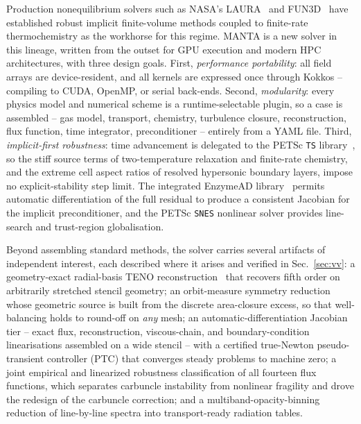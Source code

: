 \documentclass[journal,biblatex]{new-aiaa}
\begin{document}
Production nonequilibrium solvers such as NASA's LAURA~\cite{thompson_laura_2024} and FUN3D~\cite{anderson_fun3d_2025} have established robust implicit finite-volume methods coupled to finite-rate thermochemistry as the workhorse for this regime. MANTA is a new solver in this lineage, written from the outset for GPU execution and modern HPC architectures, with three design goals. First, \emph{performance portability}: all field arrays are device-resident, and all kernels are expressed once through Kokkos -- compiling to CUDA, OpenMP, or serial back-ends. Second, \emph{modularity}: every physics model and numerical scheme is a runtime-selectable plugin, so a case is assembled -- gas model, transport, chemistry, turbulence closure, reconstruction, flux function, time integrator, preconditioner -- entirely from a YAML file. Third, \emph{implicit-first robustness}: time advancement is delegated to the PETSc \texttt{TS} library~\cite{usdoe_office_of_science_sc_advanced_scientific_computing_research_ascr_petsctao_2025}, so the stiff source terms of two-temperature relaxation and finite-rate chemistry, and the extreme cell aspect ratios of resolved hypersonic boundary layers, impose no explicit-stability step limit. The integrated EnzymeAD library~\cite{moses_instead_2020} permits automatic differentiation of the full residual to produce a consistent Jacobian for the implicit preconditioner, and the PETSc \texttt{SNES} nonlinear solver provides line-search and trust-region globalisation.

Beyond assembling standard methods, the solver carries several artifacts of independent interest, each described where it arises and verified in Sec.~\ref{sec:vv}: a geometry-exact radial-basis TENO reconstruction~\cite{coveler_enhancing_2025} that recovers fifth order on arbitrarily stretched stencil geometry; an orbit-measure symmetry reduction whose geometric source is built from the discrete area-closure excess, so that well-balancing holds to round-off on \emph{any} mesh; an automatic-differentiation Jacobian tier -- exact flux, reconstruction, viscous-chain, and boundary-condition linearisations assembled on a wide stencil -- with a certified true-Newton pseudo-transient controller (PTC) that converges steady problems to machine zero; a joint empirical and linearized robustness classification of all fourteen flux functions, which separates carbuncle instability from nonlinear fragility and drove the redesign of the carbuncle correction; and a multiband-opacity-binning reduction of line-by-line spectra into transport-ready radiation tables.
\end{document}
